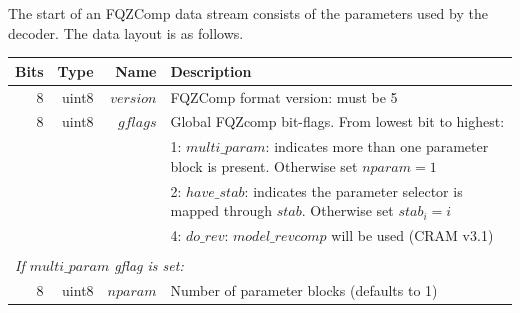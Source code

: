 \documentclass[a4paper]{article}
\begin{document}
The start of an FQZComp data stream consists of the parameters used by
the decoder. The data layout is as follows.

\begin{table}[H]
\centering
\begin{tabular}{|r|r|r|r|r|p{8cm}|l|l|}
\hline
\multicolumn{3}{|r|}{\textbf{Bits} }                   & \textbf{Type}  & \textbf{Name}                  & \multicolumn{3}{p{8.8cm}|}{\textbf{Description}} \\
\hline
\multicolumn{3}{|r|}{8}                                & uint8          & $version$                      & \multicolumn{3}{p{8.8cm}|}{FQZComp format version: must be 5}\\
\hline
\multicolumn{3}{|r|}{8}                                & uint8          & $gflags$                       & \multicolumn{3}{p{8.8cm}|}{Global FQZcomp bit-flags. From lowest bit to highest:}\\
\multicolumn{3}{|r|}{}                                 &                &                                & \multicolumn{3}{p{8.8cm}|}{1: $multi\_param$: indicates more than one parameter block is present.  Otherwise set $nparam = 1$} \\
\multicolumn{3}{|r|}{}                                 &                &                                & \multicolumn{3}{p{8.8cm}|}{2: $have\_stab$: indicates the parameter selector is mapped through $stab$.  Otherwise set $stab_i = i$} \\
\multicolumn{3}{|r|}{}                                 &                &                                & \multicolumn{3}{p{8.8cm}|}{4: $do\_rev$: $model\_revcomp$ will be used (CRAM v3.1)} \\
\hline

\multicolumn{8}{|l|}{}\\[-0.7em]
\multicolumn{8}{|l|}{\textit{If $multi\_param$ gflag is set:} } \\
\cline{2-7}
                       & \multicolumn{2}{r|}{8}        & uint8          & \multicolumn{1}{r|}{$nparam$ } & \multicolumn{2}{p{8.4cm}|}{Number of parameter blocks (defaults to 1)} & \\
\cline{2-7}


\end{tabular}
\end{table}
\end{document}
